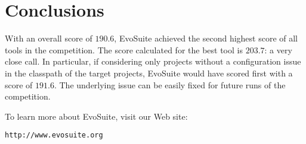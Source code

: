\documentclass[10pt,conference,compsocconf]{IEEEtran}
\newcommand{\codeid}[1]{\texttt{#1}}
\def\<#1>{\codeid{#1}}
\newcommand{\EVOSUITE}{{\sc EvoSuite}\xspace}
\begin{document}




\section{Conclusions}

With an overall score of $190.6$, \EVOSUITE achieved the second
highest score of all tools in the competition. The score calculated
for the best tool is $203.7$: a very close call.  In particular, if
considering only projects without a configuration issue in the
classpath of the target projects, \EVOSUITE would have scored first
with a score of $191.6$.
%
The underlying issue can be easily fixed for future runs of the
competition.


To learn more about \EVOSUITE, visit our Web site:
\begin{center}
\texttt{http://www.evosuite.org}
\end{center}






\def\IEEEbibitemsep{6pt}



\end{document}
